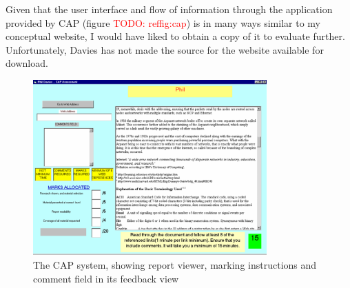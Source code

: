 \documentclass[a4paper,11pt]{report}
\newcommand{\todo}[1]{\textcolor{red}{TODO: #1}}
\begin{document}
Given that the user interface and flow of information through the application provided by CAP (figure \todo{ref{fig:cap}}) is in many ways similar to my conceptual website, I would have liked to obtain a copy of it to evaluate further. Unfortunately, Davies has not made the source for the website available for download.\par
\begin{figure}[ht]
\centering
\includegraphics[width=0.8\textwidth]{fig/CAP.png}
\caption{\footnotesize The CAP system, showing report viewer, marking instructions and comment field in its feedback view}
\label{fig:cap}
\end{figure}
\end{document}
